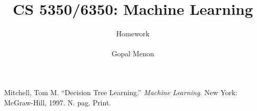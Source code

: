 \documentclass[12pt, fullpage,letterpaper]{article}
\title{CS 5350/6350: Machine Learning \semester}
\author{Homework \assignmentId\\ \\Gopal Menon}
\begin{document}
\maketitle







\begin{thebibliography}{1}
Mitchell, Tom M. \enquote{Decision Tree Learning.} \textit{Machine Learning}. New York: McGraw-Hill, 1997. N. pag. Print.
\end{thebibliography}
\end{document}
